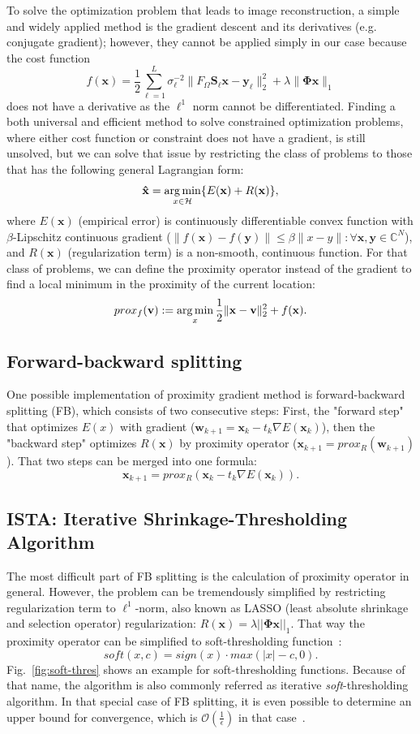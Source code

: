 To solve the optimization problem that leads to image reconstruction, a simple and widely applied method is the gradient descent and its derivatives (e.g. conjugate gradient); however, they cannot be applied simply in our case because the cost function
$$f(\mathbf{x}) = \frac{1}{2} \sum_{\ell = 1}^L \sigma_\ell^{-2} \|F_\Omega \mathbf{S}_\ell \mathbf{x} - \mathbf{y}_\ell \|_2^2 + \lambda \|\mathbf{\Phi x} \|_1$$
does not have a derivative as the $\ell^1$ norm cannot be differentiated.
Finding a both universal and efficient method to solve constrained optimization problems, where either cost function or constraint does not have a gradient, is still unsolved, but we can solve that issue by restricting the class of problems to those that has the following general Lagrangian form:
$$\mathbf{\hat{x}} = \operatorname*{arg\,min}_{x \in \mathcal{H}} \{E(\mathbf{x}) + R(\mathbf{x})\},$$
where $E(\mathbf{x})$ (empirical error) is continuously differentiable convex function with $\beta$-Lipschitz continuous gradient ($\|f(\mathbf{x}) - f(\mathbf{y})\| \leq \beta \|x - y\| : \forall \mathbf{x}, \mathbf{y} \in \mathbb{C}^N$), and $R(\mathbf{x})$ (regularization term) is a non-smooth, continuous function. For that class of problems, we can define the proximity operator instead of the gradient to find a local minimum in the proximity of the current location:
$$prox_f(\mathbf{v}) := \operatorname*{arg\,min}_x \frac{1}{2} \|\mathbf{x} - \mathbf{v} \|_2^2 + f(\mathbf{x}).$$

\subsection{Forward-backward splitting}
One possible implementation of proximity gradient method is forward-backward splitting (FB), which consists of two consecutive steps: First, the "forward step" that optimizes $E(x)$ with gradient ($\mathbf{w}_{k+1} = \mathbf{x}_k - t_k \nabla E(\mathbf{x}_k)$), then the "backward step" optimizes $R(\mathbf{x})$ by proximity operator ($\mathbf{x}_{k+1} = prox_R(\mathbf{w}_{k+1})$). That two steps can be merged into one formula:
$$\mathbf{x}_{k+1} = prox_R(\mathbf{x}_k - t_k \nabla E(\mathbf{x}_k)).$$

\subsection{ISTA: Iterative Shrinkage-Thresholding Algorithm}
The most difficult part of FB splitting is the calculation of proximity operator in general. However, the problem can be tremendously simplified by restricting regularization term to $\ell^1$-norm, also known as LASSO (least absolute shrinkage and selection operator) regularization: $R(\mathbf{x}) = \lambda ||\mathbf{\Phi x} ||_1$. That way the proximity operator can be simplified to soft-thresholding function~\cite{combettes_wajs_2005}:
$$soft(x,c) = sign(x) \cdot max(|x| - c, 0).$$
Fig.~\ref{fig:soft-thres} shows an example for soft-thresholding functions. Because of that name, the algorithm is also commonly referred as iterative \textit{soft}-thresholding algorithm. In that special case of FB splitting, it is even possible to determine an upper bound for convergence, which is $\mathcal{O}(\frac{1}{\epsilon})$ in that case~\cite{FISTA}.

